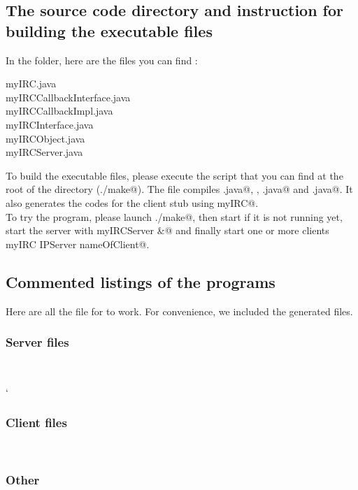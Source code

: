 \documentclass{article}
\begin{document}
\subsection{The source code directory and instruction for building the executable files}
In the \verb@etc@ folder, here are the files you can find : 
\begin{description}
\item[myIRC.java]
\item[myIRCCallbackInterface.java]
\item[myIRCCallbackImpl.java]
\item[myIRCInterface.java]
\item[myIRCObject.java]
\item[myIRCServer.java]
\end{description}

To build the executable files, please execute the script \verb@make@ that you can find at the root of the directory (\verb@./make@). The \verb@make@ file compiles \verb@myIRCObject.java@, \verb@myIRCCallbackImpl@, \verb@myIRCServer.java@ and \verb@myIRC.java@. It also generates the codes for the client stub using \verb@rmic myIRC@.\\

To try the program, please launch \verb@./make@, then start \verb@rmiregistry@ if it is not running yet, start the server with \verb@java myIRCServer &@ and finally start one or more clients \verb@java myIRC IPServer nameOfClient@.

\subsection{Commented listings of the programs}
Here are all the file for \verb@myIRC@ to work. For convenience, we included the generated files.

\subsubsection{Server files}~
	
	`
	
\subsubsection{Client files}~
	
	
	
\subsubsection{Other}~
	
\end{document}
